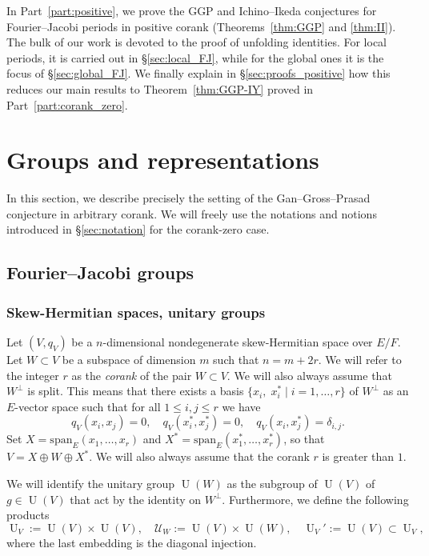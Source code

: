 \documentclass[letterpaper,11pt]{amsart}
\newcommand{\cU}{\mathcal{U}}
\newcommand{\<}{\negthickspace}
\DeclareMathOperator{\U}{U}
\theoremstyle{definition}
\theoremstyle{plain}
\theoremstyle{remark}
\numberwithin{equation}{section}
\begin{document}
In Part~\ref{part:positive}, we prove the GGP and Ichino--Ikeda conjectures for Fourier--Jacobi periods in positive corank (Theorems~\ref{thm:GGP} and \ref{thm:II}). The bulk of our work is devoted to the proof of unfolding identities. For local periods, it is carried out in \S\ref{sec:local_FJ}, while for the global ones it is the focus of \S\ref{sec:global_FJ}. We finally explain in \S\ref{sec:proofs_positive} how this reduces our main results to Theorem~\ref{thm:GGP-IY} proved in Part~\ref{part:corank_zero}.


\section{Groups and representations}

In this section, we describe precisely the setting of the Gan--Gross--Prasad conjecture in arbitrary corank. We will freely use the notations and notions introduced in \S\ref{sec:notation} for the corank-zero case. 

\subsection{Fourier--Jacobi groups}


\subsubsection{Skew-Hermitian spaces, unitary groups} \label{subsubsec:parabolic_subgroup}  Let $(V,q_V)$ be a $n$-dimensional nondegenerate skew-Hermitian space over $E/F$. Let $W \subset V$ be a subspace of dimension $m$ such that $n=m+2r$. We will refer to the integer $r$ as the \emph{corank} of the pair $W \subset V$. We will also always assume that $W^\perp$ is split. This means that there exists a basis $\{ x_i, \; x_i^*  \; | \; i=1,\hdots,r \}$ of $W^\perp$ as an $E$-vector space such that for all $1 \leq i,j \leq r$ we have
\begin{equation}
\label{eq:hyperbolic}
    q_V(x_i,x_j)=0, \quad q_V(x_i^*, x_j^*)=0, \quad q_V(x_i,x_j^*)= \delta_{i,j}.
\end{equation}
Set $X=\mathrm{span}_E(x_1,\hdots,x_r)$ and $X^*=\mathrm{span}_E(x_1^*,\hdots,x_r^*)$, so that $V=X \oplus W \oplus X^*$. We will also always assume that the corank $r$ is greater than $1$.

We will identify the unitary group $\U(W)$ as the subgroup of $\U(V)$ of $g \in \U(V)$ that act by the identity on $W^\perp$. Furthermore, we define the following products
\begin{equation*}
    \U_V:=\U(V) \times \U(V), \quad {\cU_W}:=\U(V) \times \U(W), \quad \U_V':=\U(V) \subset \U_V,
\end{equation*}
where the last embedding is the diagonal injection.
\end{document}

